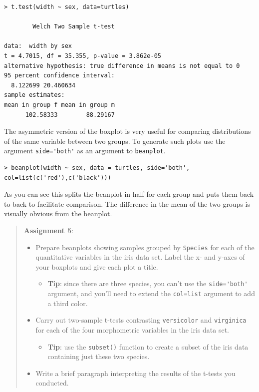 \documentclass{article}
\begin{document}
\begin{lstlisting}
> t.test(width ~ sex, data=turtles)

        Welch Two Sample t-test

data:  width by sex 
t = 4.7015, df = 35.355, p-value = 3.862e-05
alternative hypothesis: true difference in means is not equal to 0 
95 percent confidence interval:
  8.122699 20.460634 
sample estimates:
mean in group f mean in group m 
      102.58333        88.29167 
\end{lstlisting}
The asymmetric version of the boxplot is very useful for comparing
distributions of the same variable between two groups. To generate such
plots use the argument \lstinline!side='both'! as an argument to
\lstinline!beanplot!.

\begin{lstlisting}
> beanplot(width ~ sex, data = turtles, side='both', col=list(c('red'),c('black')))  
\end{lstlisting}
As you can see this splits the beanplot in half for each group and puts
them back to back to facilitate comparison. The difference in the mean
of the two groups is visually obvious from the beanplot.

\begin{quote}
\textbf{Assignment 5}:

\begin{itemize}
\item
  Prepare beanplots showing samples grouped by \lstinline!Species! for
  each of the quantitative variables in the iris data set. Label the x-
  and y-axes of your boxplots and give each plot a title.

  \begin{itemize}
  \item
    \textbf{Tip}: since there are three species, you can't use the
    \lstinline!side='both'! argument, and you'll need to extend the
    \lstinline!col=list! argument to add a third color.
  \end{itemize}
\item
  Carry out two-sample t-tests contrasting \lstinline!versicolor! and
  \lstinline!virginica! for each of the four morphometric variables in
  the iris data set.
  \begin{itemize}
  \item
    \textbf{Tip}: use the \lstinline!subset()! function to create a
    subset of the iris data containing just these two species.
  \end{itemize}
\item
  Write a brief paragraph interpreting the results of the t-tests you
  conducted.
\end{itemize}
\end{quote}
\end{document}
